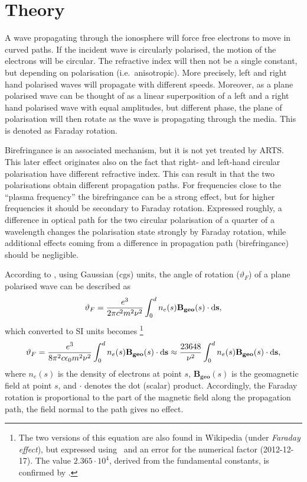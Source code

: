 \section{Theory}
\label{sec:faraday:theory}

A wave propagating through the ionosphere will force free electrons to move in
curved paths. If the incident wave is circularly polarised, the motion of the
electrons will be circular. The refractive index will then not be a single
constant, but depending on polarisation (i.e.\ anisotropic). More precisely,
left and right hand polarised waves will propagate with different speeds.
Moreover, as a plane polarised wave can be thought of as a linear superposition
of a left and a right hand polarised wave with equal amplitudes, but different
phase, the plane of polarisation will then rotate as the wave is propagating
through the media. This is denoted as Faraday rotation.

Birefringance  is an associated mechanism, but it is not
yet treated by ARTS. This later effect originates also on the fact that right-
and left-hand circular polarisation have different refractive index. This can
result in that the two polarisations obtain different propagation paths. For
frequencies close to the ``plasma frequency'' the birefringance can be a strong
effect, but for higher frequencies it should be secondary to Faraday rotation.
Expressed roughly, a difference in optical path for the two circular
polarisation of a quarter of a wavelength changes the polarisation state
strongly by Faraday rotation, while additional effects coming from a difference
in propagation path (birefringance) should be negligible.

According to \citep{rybicki:radia:79}, using Gaussian (cgs) units, the angle of
rotation (\(\vartheta_{F}\)) of a plane polarised wave can be described as
\begin{displaymath}
\vartheta_{F}=
\frac{e^{3}}{2\pi c^2 m^{2}\nu^{2}}
\int_{0}^{d}n_{e}(s) {\bf B_{geo}} (s) \cdot  {\bf \ensuremath{\mathrm{d}}s},  
\end{displaymath}
which converted to SI units becomes \citep{kraus:66}\footnote{The two versions
  of this equation are also found in Wikipedia (under \emph{Faraday effect}),
  but expressed using \Wvl\ and an error for the numerical factor
  (2012-12-17). The value $2.365\cdot10^4$, derived from the fundamental
  constants, is confirmed by \citet{wright:03}.}
\begin{equation}
\vartheta_{F}=\frac{e^{3}}{8\pi^2 c\epsilon_{0}m^{2}\nu^{2}}
\int_{0}^{d}n_{e}(s) {\bf B_{geo}} (s) \cdot  {\bf \ensuremath{\mathrm{d}}s} \approx
\frac{23648}{\nu^2} \int_{0}^{d}n_{e}(s) {\bf B_{geo}} (s) \cdot  {\bf \ensuremath{\mathrm{d}}s},
\end{equation}
where \(n_{e}(s)\) is the density of electrons at point \(s\),
\(\mathbf{B_{geo}}(s)\) is the geomagnetic field at point \(s\), and \(\cdot\)
denotes the dot (scalar) product. Accordingly, the Faraday rotation is
proportional to the part of the magnetic field along the propagation path,
the field normal to the path gives no effect.

